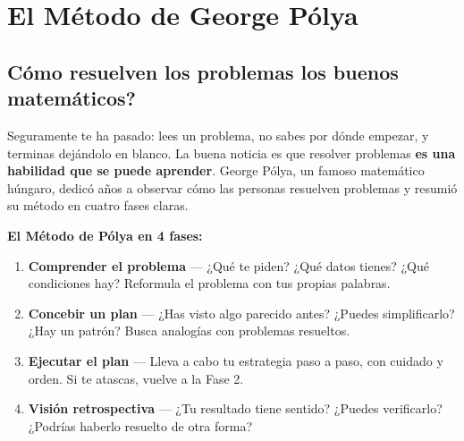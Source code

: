\documentclass[12pt, letterpaper]{article}
\begin{document}
\section{El Método de George Pólya}

\subsection{\textquestiondown Cómo resuelven los problemas los buenos matemáticos?}

Seguramente te ha pasado: lees un problema, no sabes por dónde empezar, y terminas dejándolo en blanco. La buena noticia es que resolver problemas \textbf{es una habilidad que se puede aprender}. George Pólya, un famoso matemático húngaro, dedicó años a observar cómo las personas resuelven problemas y resumió su método en cuatro fases claras.

\begin{cuadroteoria}
  \textbf{El Método de Pólya en 4 fases:}
  \begin{enumerate}[label=\textbf{Fase \arabic*:}, leftmargin=*]
    \item \textbf{Comprender el problema} — ¿Qué te piden? ¿Qué datos tienes? ¿Qué condiciones hay? Reformula el problema con tus propias palabras.
    \item \textbf{Concebir un plan} — ¿Has visto algo parecido antes? ¿Puedes simplificarlo? ¿Hay un patrón? Busca analogías con problemas resueltos.
    \item \textbf{Ejecutar el plan} — Lleva a cabo tu estrategia paso a paso, con cuidado y orden. Si te atascas, vuelve a la Fase 2.
    \item \textbf{Visión retrospectiva} — ¿Tu resultado tiene sentido? ¿Puedes verificarlo? ¿Podrías haberlo resuelto de otra forma?
  \end{enumerate}
\end{cuadroteoria}
\end{document}
